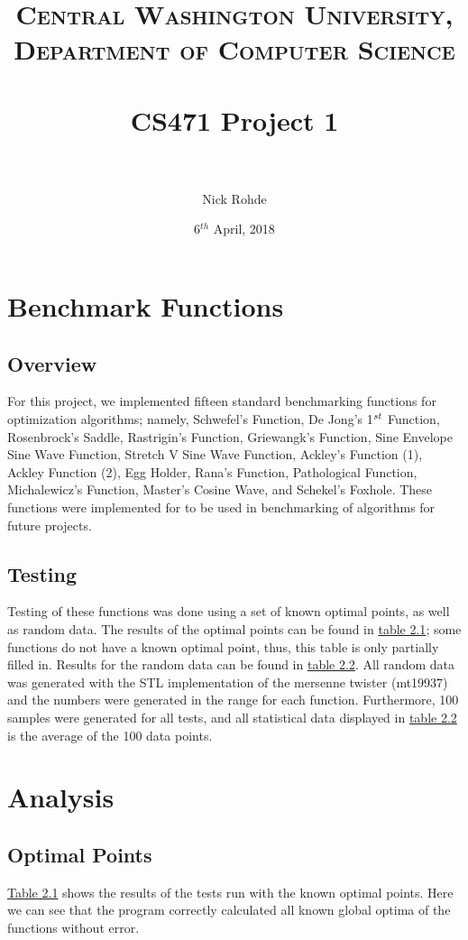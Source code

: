 \documentclass[paper=a4, fontsize=11pt]{scrartcl} %
\title{	
\normalfont \normalsize 
\textsc{Central Washington University, Department of Computer Science} \\ [25pt] %
\horrule{0.5pt} \\[0.4cm] %
\huge CS471 Project 1 \\ %
\horrule{2pt} \\[0.5cm] %
}
\author{Nick Rohde} %
\date{\normalsize 6$^{th}$ April, 2018} %
\numberwithin{equation}{section} %
\numberwithin{figure}{section} %
\numberwithin{table}{section} %
\begin{document}
\maketitle %


\section{Benchmark Functions}

	\subsection{Overview}
	For this project, we implemented fifteen standard benchmarking functions for optimization algorithms; namely, Schwefel's Function, De Jong's 1$^{\mathnormal{st}}$ Function, Rosenbrock's Saddle, Rastrigin's Function, Griewangk's Function, Sine Envelope Sine Wave Function, Stretch V Sine Wave Function, Ackley's Function (1), Ackley Function (2), Egg Holder, Rana's Function, Pathological Function, Michalewicz's Function, Master's Cosine Wave, and Schekel's Foxhole. These functions were implemented for to be used in benchmarking of algorithms for future projects. 
			
	\subsection{Testing}
	Testing of these functions was done using a set of known optimal points, as well as random data. The results of the optimal points can be found in \hyperref[T1]{table 2.1}; some functions do not have a known optimal point, thus, this table is only partially filled in. Results for the random data can be found in \hyperref[T2]{table 2.2}. All random data was generated with the STL implementation of the mersenne twister (mt19937) and the numbers were generated in the range for each function. Furthermore, 100 samples were generated for all tests, and all statistical data displayed in \hyperref[T2]{table 2.2} is the average of the 100 data points.
	\pagebreak
\section{Analysis}

	\subsection{Optimal Points}
	\hyperref[T1]{Table 2.1} shows the results of the tests run with the known optimal points. Here we can see that the program correctly calculated all known global optima of the functions without error. 
		
\end{document}
